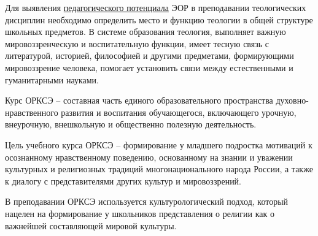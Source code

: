 Для выявления  \hyperref[goal]{педагогического потенциала} ЭОР в преподавании теологических дисциплин необходимо определить место и функцию теологии в общей структуре школьных предметов. В системе образования теология, выполняет важную мировоззренческую и воспитательную функции, имеет тесную связь с литературой, историей, философией и другими предметами, формирующими мировоззрение человека, помогает установить связи между естественными и гуманитарными науками.

Курс ОРКСЭ – составная часть единого образовательного пространства духовно-нравственного развития и воспитания обучающегося, включающего урочную, внеурочную, внешкольную и общественно полезную деятельность.

Цель учебного курса ОРКСЭ – формирование у младшего подростка мотиваций к осознанному нравственному поведению, основанному на знании и уважении культурных и религиозных традиций многонационального народа России, а также к диалогу с представителями других культур и мировоззрений.


В преподавании ОРКСЭ используется культурологический подход, который нацелен на формирование у школьников представления о религии как о важнейшей составляющей мировой культуры.

